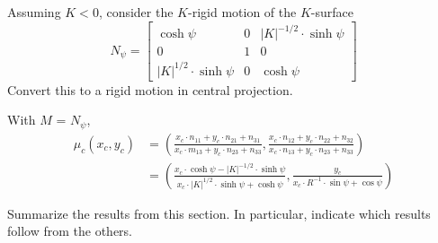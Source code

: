 \documentclass[newpage,hints,handout]{ximera}
\begin{document}
  
\begin{problem}
  Assuming $K < 0$, consider the $K$-rigid motion of the $K$-surface
  \[
  N_\psi=
  \begin{bmatrix}
    \cosh\psi & 0 & |K|^{-1/2}\cdot\sinh\psi\\
    0 & 1 & 0\\
    |K|^{1/2}\cdot\sinh\psi & 0 & \cosh\psi
  \end{bmatrix}
  \]
  Convert this to a rigid motion in central projection.
  
    \begin{freeResponse}
   With $M$ = $N_\psi$,
  \begin{align*}
  \mu_c(x_c,y_c) &= \left( \frac{x_c\cdot n_{11} + y_c\cdot n_{21} + n_{31}}{x_c\cdot m_{13} + y_c\cdot n_{23} + n_{33}},
    \frac{x_c\cdot n_{12} + y_c\cdot n_{22} + n_{32}}{x_c\cdot n_{13} + y_c\cdot n_{23} + n_{33}} \right) \\
    &= \left( \frac{x_c\cdot \cosh\psi -  |K|^{-1/2}\cdot \sinh\psi}{x_c \cdot |K|^{1/2}\cdot \sinh\psi + \cosh\psi},
    \frac{y_c}{x_c\cdot R^{-1} \cdot \sin\psi + \cos\psi} \right) 
  \end{align*}
  \end{freeResponse}
\end{problem}


\begin{problem}
Summarize the results from this section. In particular, indicate which
results follow from the others.
\begin{freeResponse}
\end{freeResponse}
\end{problem}
\end{document}
